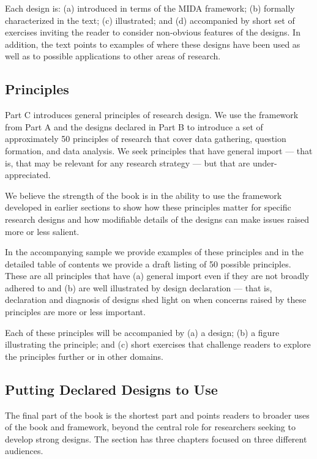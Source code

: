 \documentclass[11pt]{article}
\begin{document}
Each design is: (a) introduced in terms of the MIDA framework; (b) formally characterized in the text; (c) illustrated; and (d) accompanied by short set of exercises inviting the reader to consider non-obvious features of the designs. In addition, the text points to examples of where these designs have been used as well as to possible applications to other areas of research.

\subsection{Principles}

Part C introduces general principles of research design. We use the framework from Part A and the designs declared in Part B to introduce a set of approximately 50 principles of research that cover data gathering, question formation, and data analysis. We seek principles that have general import --- that is, that may be relevant for any research strategy --- but that are under-appreciated.

We believe the strength of the book is in the ability to use the framework developed in earlier sections to show how these principles matter for specific research designs and how modifiable details of the designs can make issues raised more or less salient. 

In the accompanying sample we provide examples of these principles and in the detailed table of contents we provide a draft listing of 50 possible principles. These are all principles that have (a) general import even if they are not broadly adhered to and (b) are well illustrated by design declaration --- that is, declaration and diagnosis of designs shed light on when concerns raised by these principles are more or less important.

Each of these principles will be accompanied by (a) a design; (b) a figure illustrating the principle; and (c) short exercises that challenge readers to explore the principles further or in other domains. 

\subsection{Putting Declared Designs to Use}
The final part of the book is the shortest part and points readers to broader uses of the book and framework, beyond the central role for researchers seeking to develop strong designs. The section has three chapters focused on three different audiences.
\end{document}
